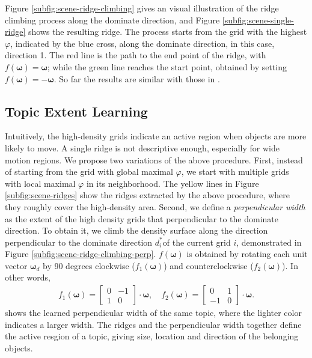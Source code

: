     Figure \ref{subfig:scene-ridge-climbing} gives an visual illustration of the ridge climbing process along the dominate direction, and Figure \ref{subfig:scene-single-ridge} shows the resulting ridge. The process starts from the grid with the highest $\varphi$, indicated by the blue cross, along the dominate direction, in this case, direction 1. 
    The red line is the path to the end point of the ridge, with $f(\bm{\omega}) = \bm{\omega}$; while the green line reaches the start point, obtained by setting $f(\bm{\omega}) = -\bm{\omega}$. So far the results are similar with those in \cite{zhao2013counting}.

    

\subsection{Topic Extent Learning}
    Intuitively, the high-density grids indicate an active region when objects are more likely to move.
    A single ridge is not descriptive enough, especially for wide motion regions. 
    We propose two variations of the above procedure.
    First, instead of starting from the grid with global maximal $\varphi$, we start with multiple grids with local maximal $\varphi$ in its neighborhood. 
    The yellow lines in Figure \ref{subfig:scene-ridges} show the ridges extracted by the above procedure, where they roughly cover the high-density area. 
    Second, we define a \emph{perpendicular width} as the extent of the high density grids that perpendicular to the dominate direction. To obtain it, we climb the density surface along the direction perpendicular to the dominate direction $d^*_i$of the current grid $i$, demonstrated in Figure \ref{subfig:scene-ridge-climbing-perp}.
    $f(\bm{\omega})$ is obtained by rotating each unit vector $\bm{\omega}_{d}$ by 90 degrees clockwise ($f_1(\bm{\omega})$) and counterclockwise ($f_2(\bm{\omega})$). In other words, 
    \begin{align*}
        f_1(\bm{\omega}) = \left[\begin{array}{cc} 0 & -1\\ 1 & 0\end{array}\right]\cdot\bm{\omega},\quad
        f_2(\bm{\omega}) = \left[\begin{array}{cc} 0 & 1\\ -1 & 0\end{array}\right]\cdot\bm{\omega}.
    \end{align*}
     shows the learned perpendicular width of the same topic, where the lighter color indicates a larger width. The ridges and the perpendicular width together define the active resgion of a topic, giving size, location and direction of the belonging objects.


